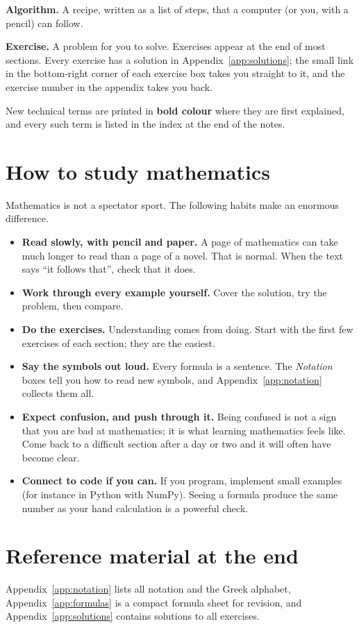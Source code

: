 \begin{tcolorbox}[mlbox=MLalgorithm]
\textbf{\color{MLalgorithm}Algorithm.} A recipe, written as a list of steps, that a
computer (or you, with a pencil) can follow.
\end{tcolorbox}
\begin{tcolorbox}[mlbox=MLexercise,colback=MLexercise!3!white]
\textbf{\color{MLexercise}Exercise.} A problem for you to solve. Exercises appear at
the end of most sections. Every exercise has a solution in
Appendix~\ref{app:solutions}; the small link in the bottom-right corner of
each exercise box takes you straight to it, and the exercise number in the
appendix takes you back.
\end{tcolorbox}

New technical terms are printed in \textbf{\color{MLterm}bold colour} where
they are first explained, and every such term is listed in the index at the
end of the notes.

\section*{How to study mathematics}

Mathematics is not a spectator sport. The following habits make an enormous
difference.

\begin{itemize}
  \item \textbf{Read slowly, with pencil and paper.} A page of mathematics can take
    much longer to read than a page of a novel. That is normal. When the text
    says ``it follows that'', check that it does.
  \item \textbf{Work through every example yourself.} Cover the solution, try the
    problem, then compare.
  \item \textbf{Do the exercises.} Understanding comes from doing. Start with the
    first few exercises of each section; they are the easiest.
  \item \textbf{Say the symbols out loud.} Every formula is a sentence. The
    \emph{Notation} boxes tell you how to read new symbols, and
    Appendix~\ref{app:notation} collects them all.
  \item \textbf{Expect confusion, and push through it.} Being confused is not a
    sign that you are bad at mathematics; it is what learning mathematics feels
    like. Come back to a difficult section after a day or two and it will often
    have become clear.
  \item \textbf{Connect to code if you can.} If you program, implement small
    examples (for instance in Python with NumPy). Seeing a formula produce the
    same number as your hand calculation is a powerful check.
\end{itemize}

\section*{Reference material at the end}

Appendix~\ref{app:notation} lists all notation and the Greek alphabet,
Appendix~\ref{app:formulas} is a compact formula sheet for revision, and
Appendix~\ref{app:solutions} contains solutions to all exercises.
